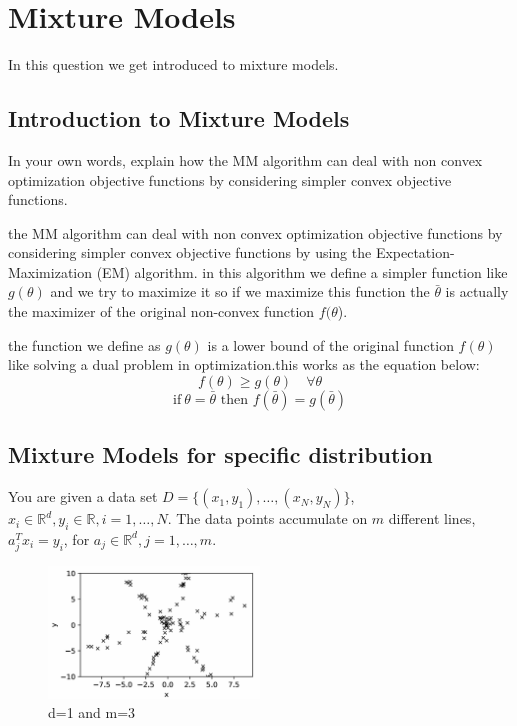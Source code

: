 \section{Mixture Models}

In this question we get introduced to mixture models.
\subsection{Introduction to Mixture Models}
In your own words, explain how the MM algorithm can deal with non convex optimization objective functions by considering simpler convex objective functions.
\begin{qsolve}
    \begin{qsolve}[]
        the MM algorithm can deal with non convex optimization objective functions by considering simpler convex objective functions by using the Expectation-Maximization (EM) algorithm. 
        in this algorithm we define a simpler function like $g(\theta)$ and we try to maximize it so if we maximize this function the $\bar{\theta}$ is actually the maximizer of the original non-convex function $f(\theta$).
        
        the function we define as $g(\theta)$ is a lower bound of the original function $f(\theta)$ like solving a dual problem in optimization.this works as the equation below:
        $$f(\theta) \geq g(\theta) \quad \forall \theta$$
        $$ \text{if}\ \theta = \bar{\theta} \text{ then } f(\bar{\theta}) = g(\bar{\theta})$$
    \end{qsolve}
\end{qsolve}
\subsection{Mixture Models for specific distribution}
You are given a data set $D = \{(x_1, y_1), \ldots, (x_N, y_N)\}$, $x_i \in \mathbb{R}^d, y_i \in \mathbb{R}, i = 1, \ldots, N$. The data points accumulate on $m$ different lines, $a_j^Tx_i = y_i$, for $a_j \in \mathbb{R}^d, j = 1, \ldots, m$.

\begin{figure}[h]
    \centering
    \includegraphics[width=0.5\textwidth]{image.png}
    \caption{d=1 and m=3}
\end{figure}

